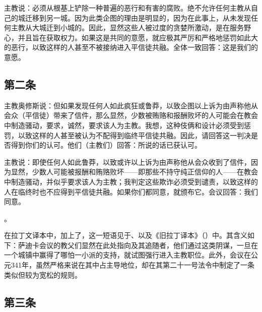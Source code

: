 主教说：必须从根基上铲除一种普遍的恶行和有害的腐败。绝不允许任何主教从自己的城迁移到另一城。因为此类企图的理由是明显的，因为在此事上，从未发现任何主教从大城迁到小城的。因此，显然这些人被过度的贪婪所激动，是在服务野心，并且旨在获取权力。如果这是共同的意愿，就应极其严厉和严格地惩罚如此大的恶行，以致这样的人甚至不被接纳进入平信徒共融。全体一致回答：这是我们的意愿。\par


\subsection{第二条}

主教奥修斯说：但如果发现任何人如此疯狂或鲁莽，以致企图以上诉为由声称他从会众（平信徒）带来了信件，那么显然，少数被贿赂和报酬败坏的人可能会在教会中制造骚动，要求，诚然，要求该人为主教。我想，这种伎俩和设计必须受到惩罚，以致这样的人甚至被认为不配得到临终平信徒共融。因此，请回答这一判决是否得到你们的认可。他们（主教们）回答：所说的话已获认可。\par

主教说：即使任何人如此鲁莽，以致或许以上诉为由声称他从会众收到了信件，因为显然，少数人可能被报酬和贿赂败坏——即那些不持守纯正信仰的人——在教会中制造骚动，并似乎要求该人为主教；我判定这些欺诈必须受到谴责，以致这样的人在临终时也不应得到平信徒共融。如果你们都同意，就颁布它。会议回答：我们同意。\par

。\par

在拉丁文译本中，加上了，这一短语见于、以及《旧拉丁译本》（）中。其含义如下：萨迪卡会议的教父们显然在此处指向及其追随者，他们通过这类阴谋，一旦在一个城镇中赢得了哪怕一小派的支持，就试图强行进入主教职位。此外，会议在公元341年，虽然严格来说在其中占主导地位，却在其第二十一号法令中制定了一条类似但较为宽松的规则。\par


\subsection{第三条}

